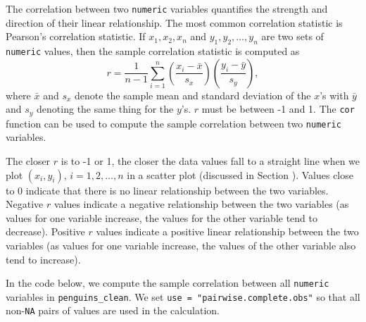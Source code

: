 \documentclass[
]{book}
\theoremstyle{definition}
\theoremstyle{definition}
\theoremstyle{definition}
\theoremstyle{definition}
\theoremstyle{remark}
\begin{document}
The correlation between two \texttt{numeric} variables quantifies the strength and direction of their linear relationship. The most common correlation statistic is Pearson's correlation statistic. If \(x_1, x_2, x_n\) and \(y_1, y_2, \ldots, y_n\) are two sets of \texttt{numeric} values, then the sample correlation statistic is computed as \[r = \frac{1}{n-1}\sum_{i=1}^n\left(\frac{x_i - \bar{x}}{s_x}\right)\left(\frac{y_i - \bar{y}}{s_y}\right),\] where \(\bar{x}\) and \(s_x\) denote the sample mean and standard deviation of the \(x\)'s with \(\bar{y}\) and \(s_y\) denoting the same thing for the \(y\)'s. \(r\) must be between -1 and 1. The \texttt{cor} function can be used to compute the sample correlation between two \texttt{numeric} variables.

The closer \(r\) is to -1 or 1, the closer the data values fall to a straight line when we plot \((x_i, y_i)\), \(i=1,2,\ldots,n\) in a scatter plot (discussed in Section ). Values close to 0 indicate that there is no linear relationship between the two variables. Negative \(r\) values indicate a negative relationship between the two variables (as values for one variable increase, the values for the other variable tend to decrease). Positive \(r\) values indicate a positive linear relationship between the two variables (as values for one variable increase, the values of the other variable also tend to increase).

In the code below, we compute the sample correlation between all \texttt{numeric} variables in \texttt{penguins\_clean}. We set \texttt{use\ =\ "pairwise.complete.obs"} so that all non-\texttt{NA} pairs of values are used in the calculation.
\end{document}

